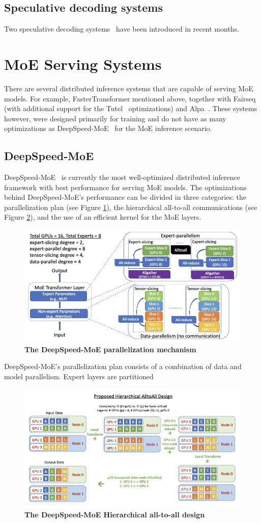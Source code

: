 \subsection{Speculative decoding systems}
Two speculative decoding systems~\cite{speculative-decoding-berkeley, speculative-decoding-google} have been introduced in recent months.

\section{MoE Serving Systems}\label{chpt2-moe-serving}
There are several distributed inference systems that are capable of serving MoE models. For example, FasterTransformer mentioned above, together with Fairseq~\cite{fairseq} (with additional support for the Tutel~\cite{tutel} optimizations) and Alpa~\cite{alpa}. These systems however, were designed primarily for training and do not have as many optimizations as DeepSpeed-MoE~\cite{deepspeed-moe} for the MoE inference scenario.

\subsection{DeepSpeed-MoE}
DeepSpeed-MoE~\cite{deepspeed-moe} is currently the most well-optimized distributed inference framework with best performance for serving MoE models. The optimizations behind DeepSpeed-MoE's performance can be divided in three categories: the parallelization plan (see Figure \ref{fig:deepspeed-moe-parallelization}), the hierarchical all-to-all communications (see Figure \ref{fig:deepspeed-moe-a2a}), and the use of an efficient kernel for the MoE layers.
\begin{figure}[H]
    \centering
    \includegraphics[width=0.6\linewidth]{figures/deepspeed-moe-parallelization.png}
    \caption{\textbf{The DeepSpeed-MoE parallelization mechanism~\cite{deepspeed-moe}}}
    \label{fig:deepspeed-moe-parallelization}
\end{figure}
DeepSpeed-MoE's parallelization plan consists of a combination of data and model parallelism. Expert layers are partitioned 
\begin{figure}[H]
    \centering
    \includegraphics[width=0.6\linewidth]{figures/deepspeed-moe-a2a.png}
    \caption{\textbf{The DeepSpeed-MoE Hierarchical all-to-all design~\cite{deepspeed-moe}}}
    \label{fig:deepspeed-moe-a2a}
\end{figure}
